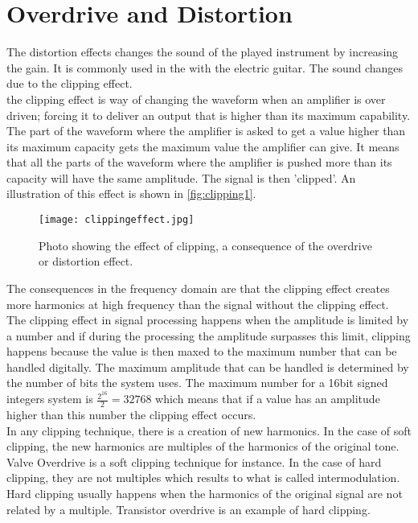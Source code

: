 \section{Overdrive and Distortion} 

The distortion effects changes the sound of the played instrument by increasing the gain. It is commonly used in the with the electric guitar. The sound changes due to the clipping effect. \\
the clipping effect is way of changing the waveform when an amplifier is over driven; forcing it to deliver an output that is higher than its maximum capability. \\
The part of the waveform where the amplifier is asked to get a value higher than its maximum capacity gets the maximum value the amplifier can give. It means that all the parts of the waveform where the amplifier is pushed more than its capacity will have the same amplitude. The signal is then 'clipped'. An illustration of this effect is shown in \autoref{fig:clipping1}.\\

\begin{figure} [htbp]
  \texttt{[image: clippingeffect.jpg]}
  \caption{Photo showing the effect of clipping, a consequence of the overdrive or distortion effect.}
  \label{fig:clipping1}
\end{figure}


The consequences in the frequency domain are that the clipping effect creates more harmonics at high frequency than the signal without the clipping effect. \\

The clipping effect in signal processing happens when the amplitude is limited by a number and if during the processing the amplitude surpasses this limit, clipping happens because the value is then maxed to the maximum number that can be handled digitally. The maximum amplitude that can be handled is determined by the number of bits the system uses. The maximum number for a 16bit signed integers system is $\frac{2^{16}}{2} = 32768$ which means that if a value has an amplitude higher than this number the clipping effect occurs. \\

In any clipping technique, there is a creation of new harmonics. In the case of soft clipping, the new harmonics are multiples of the harmonics of the original tone. Valve Overdrive is a soft clipping technique for instance. In the case of hard clipping, they are not multiples which results to what is called intermodulation. Hard clipping usually happens when the harmonics of the original signal are not related by a multiple. Transistor overdrive is an example of hard clipping.\\
